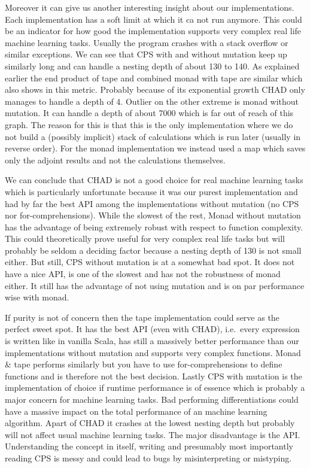 Moreover it can give us another interesting insight about our implementations. Each implementation has a soft limit at which it ca not run anymore. This could be an indicator for how good the implementation supports very complex real life machine learning tasks.  Usually the program crashes with a stack overflow or similar exceptions. We can see that CPS with and without mutation keep up similarly long and can handle a nesting depth of about 130 to 140. As explained earlier the end product of tape and combined monad with tape are similar which also shows in this metric. Probably because of its exponential growth CHAD only manages to handle a depth of 4. Outlier on the other extreme is monad without mutation. It can handle a depth of about 7000 which is far out of reach of this graph. The reason for this is that this is the only implementation where we do not build a (possibly implicit) stack of calculations which is run later (usually in reverse order). For the monad implementation we instead used a map which saves only the adjoint results and not the calculations themselves.

We can conclude that CHAD is not a good choice for real machine learning tasks which is particularly unfortunate because it was our purest implementation and had by far the best API among the implementations without mutation (no CPS nor for-comprehensions). While the slowest of the rest, Monad without mutation has the advantage of being extremely robust with respect to function complexity. This could theoretically prove useful for very complex real life tasks but will probably be seldom a deciding factor because a nesting depth of 130 is not small either. But still, CPS without mutation is at a somewhat bad spot. It does not have a nice API, is one of the slowest and has not the robustness of monad either. It still has the advantage of not using mutation and is on par performance wise with monad.

If purity is not of concern then the tape implementation could serve as the perfect sweet spot. It has the best API (even with CHAD), i.e.\ every expression is written like in vanilla Scala, has still a massively better performance than our implementations without mutation and supports very complex functions. Monad \& tape performs similarly but you have to use for-comprehensions to define functions and is therefore not the best decision. Lastly CPS with mutation is the implementation of choice if runtime performance is of essence which is probably a major concern for machine learning tasks. Bad performing differentiations could have a massive impact on the total performance of an machine learning algorithm. Apart of CHAD it crashes at the lowest nesting depth but probably will not affect usual machine learning tasks. The major disadvantage is the API. Understanding the concept in itself, writing and presumably most importantly reading CPS is messy and could lead to bugs by misinterpreting or mistyping.

